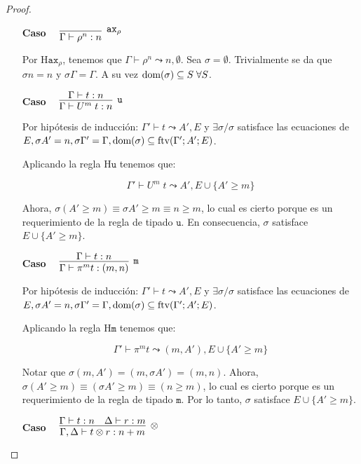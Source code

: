 \begin{proof}
\begin{itemize}
\vspace{\baselineskip}
     \item[\textbf{Caso}] \(\quad\raisebox{-.35\baselineskip}{\infer[\mathtt{ax}_\rho]
     {\Gamma \vdash \rho^n : n}
     {}}\)


Por $\text{H}\mathtt{ax}_\rho$, tenemos que $\Gamma \vdash \rho^n\leadsto n, \emptyset$. Sea $\sigma=\emptyset$. Trivialmente se da que $\sigma n = n$ y $\sigma \Gamma = \Gamma$. A su vez $\text{dom}(\sigma) \subseteq S\;\forall S$.

\vspace{\baselineskip}
     \item[\textbf{Caso}] \(\quad\raisebox{-.35\baselineskip}{\infer[\mathtt{u}]
         {\Gamma \vdash U^m\;t : n}
         {\Gamma \vdash t : n}}\)

Por hipótesis de inducción: $\Gamma' \vdash t \leadsto A', E$ y $\exists \sigma / \sigma$ satisface las ecuaciones de $E, \sigma A'=n, \sigma \Gamma'=\Gamma, \text{dom}(\sigma) \subseteq \text{ftv}(\Gamma';A';E)$.

Aplicando la regla $\text{H}\mathtt{u}$ tenemos que:

\[\Gamma'\vdash U^m\;t \leadsto A', E \cup \{A' \geq m\}\]

Ahora, $\sigma (A' \geq m) \equiv \sigma A' \geq m \equiv n \geq m$, lo cual es cierto porque es un requerimiento de la regla de tipado $\mathtt{u}$. En consecuencia, $\sigma$ satisface $E\cup \{A' \geq m\}$.

\vspace{\baselineskip}
     \item[\textbf{Caso}] \(\quad\raisebox{-.35\baselineskip}{\infer[\mathtt{m}]
         {\Gamma \vdash \pi^m t : (m, n)}
         {\Gamma \vdash t : n}}\)

Por hipótesis de inducción: $\Gamma' \vdash t \leadsto A', E$ y $\exists \sigma / \sigma$ satisface las ecuaciones de $E, \sigma A'=n, \sigma \Gamma'=\Gamma, \text{dom}(\sigma) \subseteq \text{ftv}(\Gamma';A';E)$.

Aplicando la regla $\text{H}\mathtt{m}$ tenemos que:

\[\Gamma'\vdash \pi^m t \leadsto (m, A'), E \cup \{A' \geq m\}\]

Notar que $\sigma (m, A') = (m, \sigma A') = (m, n)$. Ahora, $\sigma (A' \geq m) \equiv (\sigma A' \geq m) \equiv (n \geq m)$, lo cual es cierto porque es un requerimiento de la regla de tipado $\mathtt{m}$. Por lo tanto, $\sigma$ satisface $E\cup \{A' \geq m\}$.

\vspace{\baselineskip}
     \item[\textbf{Caso}] \(\quad\raisebox{-.35\baselineskip}{\infer[\otimes]
     {\Gamma, \Delta \vdash t \otimes r : n + m}
     {\Gamma \vdash t: n \quad \Delta \vdash r : m}}\)



\end{itemize}
\end{proof}
